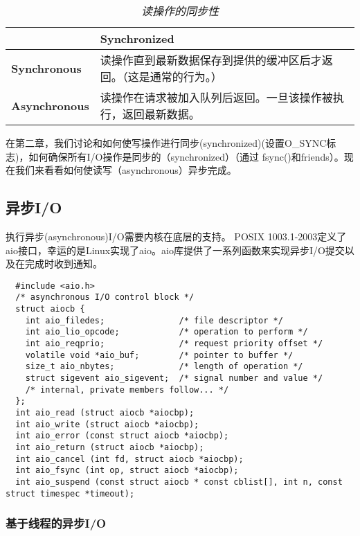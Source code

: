 \begin{table}[htp]
\caption{\emph{读操作的同步性}}
\begin{tabular}{p{2.5cm}p{11.5cm}}\toprule
\rowcolor[gray]{.9}
 & \textbf{Synchronized} \\ \midrule
 \textbf{Synchronous} & 读操作直到最新数据保存到提供的缓冲区后才返回。（这是通常的行为。） \\
 \textbf{Asynchronous} & 读操作在请求被加入队列后返回。一旦该操作被执行，返回最新数据。 \\ \bottomrule
\end{tabular}
\end{table}

在第二章，我们讨论和如何使写操作进行同步(synchronized)(设置O\_SYNC标志)，如何确保所有I/O操作是同步的（synchronized）（通过 fsync()和friends）。现在我们来看看如何使读写（asynchronous）异步完成。

\subsection{异步I/O}

执行异步(asynchronous)I/O需要内核在底层的支持。 POSIX 1003.1-2003定义了aio接口，幸运的是Linux实现了aio。aio库提供了一系列函数来实现异步I/O提交以及在完成时收到通知。

\begin{lstlisting}
  #include <aio.h>
  /* asynchronous I/O control block */
  struct aiocb {
    int aio_filedes;               /* file descriptor */
    int aio_lio_opcode;            /* operation to perform */
    int aio_reqprio;               /* request priority offset */
    volatile void *aio_buf;        /* pointer to buffer */
    size_t aio_nbytes;             /* length of operation */
    struct sigevent aio_sigevent;  /* signal number and value */
    /* internal, private members follow... */
  };
  int aio_read (struct aiocb *aiocbp);
  int aio_write (struct aiocb *aiocbp);
  int aio_error (const struct aiocb *aiocbp);
  int aio_return (struct aiocb *aiocbp);
  int aio_cancel (int fd, struct aiocb *aiocbp);
  int aio_fsync (int op, struct aiocb *aiocbp);
  int aio_suspend (const struct aiocb * const cblist[], int n, const struct timespec *timeout);   
\end{lstlisting}

\subsubsection{基于线程的异步I/O}

